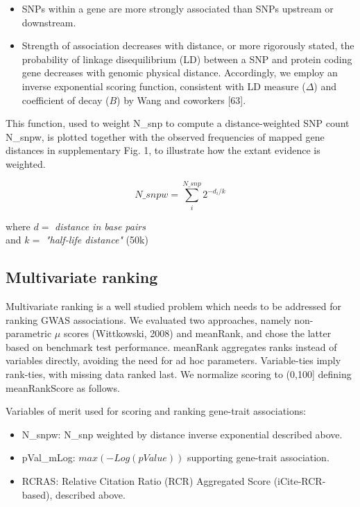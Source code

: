 \begin{itemize}
\item SNPs within a gene are more strongly associated than SNPs upstream or downstream.
\item Strength of association decreases with distance, or more rigorously stated, the probability of linkage disequilibrium (LD) between a SNP and protein coding gene decreases with genomic physical distance. Accordingly, we employ an inverse exponential scoring function, consistent with LD measure ($\Delta$) and coefficient of decay ($B$) by Wang and coworkers [63]. 
\end{itemize}

This function, used to weight N\_snp to compute a distance-weighted SNP count N\_snpw, is plotted together with the observed frequencies of mapped gene distances in supplementary Fig. 1, to illustrate how the extant evidence is weighted. 

\begin{equation}
    N\_snpw = \sum_{i}^{N\_snp}  2^{-d_{i}/k}
\end{equation}

\begin{center}
    where $ d = $ \emph{distance in base pairs} \\
    and $ k = $ \emph{"half-life distance"} (50k)
\end{center}

\subsection{Multivariate ranking}

Multivariate ranking is a well studied problem which needs to be addressed for ranking GWAS associations. We evaluated two approaches, namely non-parametric $\mu$ scores (Wittkowski, 2008) and meanRank, and chose the latter based on benchmark test performance. meanRank aggregates ranks instead of variables directly, avoiding the need for ad hoc parameters. Variable-ties imply rank-ties, with missing data ranked last. We normalize scoring to (0,100] defining meanRankScore as follows.

Variables of merit used for scoring and ranking gene-trait associations:

\begin{itemize}
\item N\_snpw: N\_snp weighted by distance inverse exponential described above.
\item pVal\_mLog: $max(-Log(pValue))$ supporting gene-trait association.
\item RCRAS: Relative Citation Ratio (RCR) Aggregated Score (iCite-RCR-based), described above.
\end{itemize}

